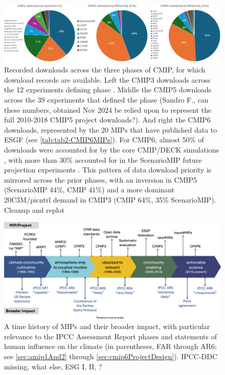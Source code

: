 \documentclass[gmd, preprint]{copernicus}
\def\cred#1{{\color{red}#1}}
\begin{document}
\begin{figure}
    \centering
    \includegraphics[width=\textwidth]{241111_durack1-cmip3-cmip5-cmip6-experiments.png}
    \caption{Recorded downloads across the three phases of CMIP, for which download records are available. Left the CMIP3 downloads across the 12 experiments defining phase \citep{meehl_wcrp_2007}. Middle the CMIP5 downloads across the \cred{39} experiments that defined the phase \citep[represented by the 8 MIPs identified in \autoref{tab:tabAppA1-MIPExperiments};][]{taylor_overview_2012} (\cred{Sandro F., can these numbers, obtained Nov 2024 be relied upon to represent the full 2010-2018 CMIP5 project downloads?}). And right the CMIP6 downloads, represented by the 20 MIPs that have published data to ESGF (see \autoref{tab:tab2-CMIP6MIPs}). For CMIP6, almost 50\% of downloads were accounted for by the core CMIP/DECK simulations \citep{eyring_overview_2016}, with more than 30\% accounted for in the ScenarioMIP future projection experiments \citep{oneill_scenario_2016}. This pattern of data download priority is mirrored across the prior phases, with an inversion in CMIP5 (ScenarioMIP 44\%, CMIP 41\%) and a more dominant 20C3M/picntrl demand in CMIP3 (CMIP 64\%, 35\% ScenarioMIP). \cred{Cleanup and replot}}
    \label{fig:fig5-MIPDownloads}
\end{figure}

\begin{figure}
    \centering
    \includegraphics[width=\textwidth]{241106_durack1-AMIP-CMIP-IPCC-Impact.png}
    \caption{A time history of MIPs and their broader impact, with particular relevance to the IPCC Assessment Report phases and statements of human influence on the climate (in parentheses, FAR through AR6; see \autoref{sec:amip1And2} through \autoref{sec:cmip6ProjectDesign}). \cred{IPCC-DDC missing, what else, ESG I, II, ?}}
    \label{fig:fig6-MIPImpact}
\end{figure}
\end{document}

